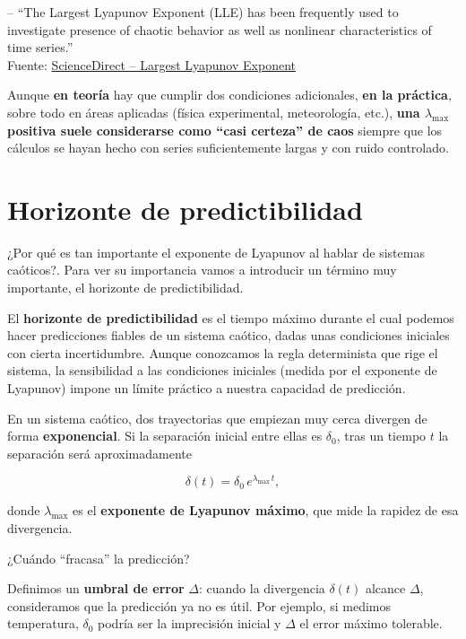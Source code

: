 \documentclass[
  10pt,
  a4paper,
  DIV=11,
  numbers=noendperiod,
  open=any]{scrreprt}
\numberwithin{equation}{chapter}
\numberwithin{equation}{chapter}
\renewcommand{\[}{\begin{equation}}
\renewcommand{\]}{\end{equation}}
\begin{document}
-- ``The Largest Lyapunov Exponent (LLE) has been frequently used to
investigate presence of chaotic behavior as well as nonlinear
characteristics of time series.''\\
Fuente:
\href{https://www.sciencedirect.com/topics/engineering/largest-lyapunov-exponent}{ScienceDirect
-- Largest Lyapunov Exponent}

Aunque \textbf{en teoría} hay que cumplir dos condiciones adicionales,
\textbf{en la práctica}, sobre todo en áreas aplicadas (física
experimental, meteorología, etc.), \textbf{una \(\lambda_{\max}\)
positiva suele considerarse como ``casi certeza'' de caos} siempre que
los cálculos se hayan hecho con series suficientemente largas y con
ruido controlado.

\section{Horizonte de
predictibilidad}\label{horizonte-de-predictibilidad}

¿Por qué es tan importante el exponente de Lyapunov al hablar de
sistemas caóticos?. Para ver su importancia vamos a introducir un
término muy importante, el horizonte de predictibilidad.

El \textbf{horizonte de predictibilidad} es el tiempo máximo durante el
cual podemos hacer predicciones fiables de un sistema caótico, dadas
unas condiciones iniciales con cierta incertidumbre. Aunque conozcamos
la regla determinista que rige el sistema, la sensibilidad a las
condiciones iniciales (medida por el exponente de Lyapunov) impone un
límite práctico a nuestra capacidad de predicción.

En un sistema caótico, dos trayectorias que empiezan muy cerca divergen
de forma \textbf{exponencial}. Si la separación inicial entre ellas es
\(\delta_0\), tras un tiempo \(t\) la separación será aproximadamente

\begin{equation}

\delta(t) = \delta_0\,e^{\lambda_{\max}\,t},

\end{equation}

donde \(\lambda_{\max}\) es el \textbf{exponente de Lyapunov máximo},
que mide la rapidez de esa divergencia.

¿Cuándo ``fracasa'' la predicción?

Definimos un \textbf{umbral de error} \(\Delta\): cuando la divergencia
\(\delta(t)\) alcance \(\Delta\), consideramos que la predicción ya no
es útil. Por ejemplo, si medimos temperatura, \(\delta_0\) podría ser la
imprecisión inicial y \(\Delta\) el error máximo tolerable.
\end{document}
